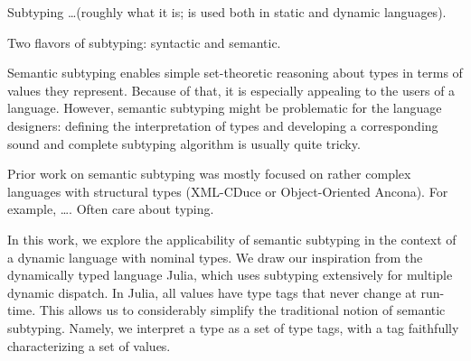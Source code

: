 Subtyping \ldots (roughly what it is; is used both in static and dynamic
languages).

Two flavors of subtyping: syntactic and semantic. 

Semantic subtyping enables simple set-theoretic reasoning about types
in terms of values they represent.
Because of that, it is especially appealing to the users of a language.
However, semantic subtyping might be problematic for the language designers:
defining the interpretation of types and developing a corresponding
sound and complete subtyping algorithm is usually quite tricky.

Prior work on semantic subtyping was mostly focused on rather complex languages
with structural types (XML-CDuce or Object-Oriented Ancona).
For example, \ldots. Often care about typing.

In this work, we explore the applicability of semantic subtyping in the context
of a dynamic language with nominal types. We draw our inspiration from
the dynamically typed language Julia, which uses subtyping extensively
for multiple dynamic dispatch. 
In Julia, all values have type tags that never change at run-time.
This allows us to considerably simplify the traditional notion 
of semantic subtyping.
Namely, we interpret a type as a set of type tags, 
with a tag faithfully characterizing a set of values.





